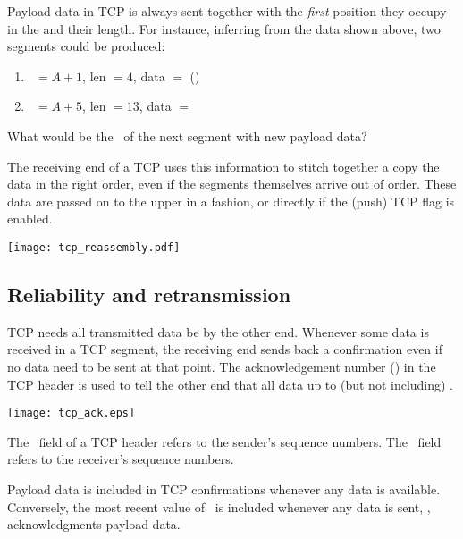 Payload data in TCP is always sent together with the \textit{first} position they occupy in the 
 and their length.
For instance, inferring from the data shown above, two segments could be produced:

\begin{enumerate}
\item \nseq\ $= A+1$, len $= 4$, data $= $  ()
\item \nseq\ $= A+5$, len $= 13$, data $=$ 
\end{enumerate}

\begin{exercise}
What would be the \nseq\ of the next segment with new payload data?
\end{exercise}

The receiving end of a TCP  uses this information to stitch together 
a copy the data in the right order, even if the segments themselves arrive out of order. 
%
These data are passed on to the upper  in a 
 fashion, or directly if the  (push) TCP flag is enabled.

\begin{center}
\texttt{[image: tcp\_reassembly.pdf]}
\end{center}


\subsection{Reliability and retransmission}
TCP needs all transmitted data be  by the other end.
Whenever some data is received in a TCP segment, the receiving end sends back a confirmation 
even if no data need to be sent at that point.
The acknowledgement number (\nack) in the TCP header is used to tell the other end that all data up to 
(but not including) \nack.

\begin{center}
\texttt{[image: tcp\_ack.eps]}
\end{center}

\begin{remark}
The \nseq\ field of a TCP header refers to the sender's sequence numbers. 
The \nack\ field refers to the receiver's sequence numbers.
\end{remark}

Payload data is included in TCP confirmations whenever any data is available.
Conversely, the most recent value of \nack\ is included whenever any data is sent,
\ie, acknowledgments  payload data.

